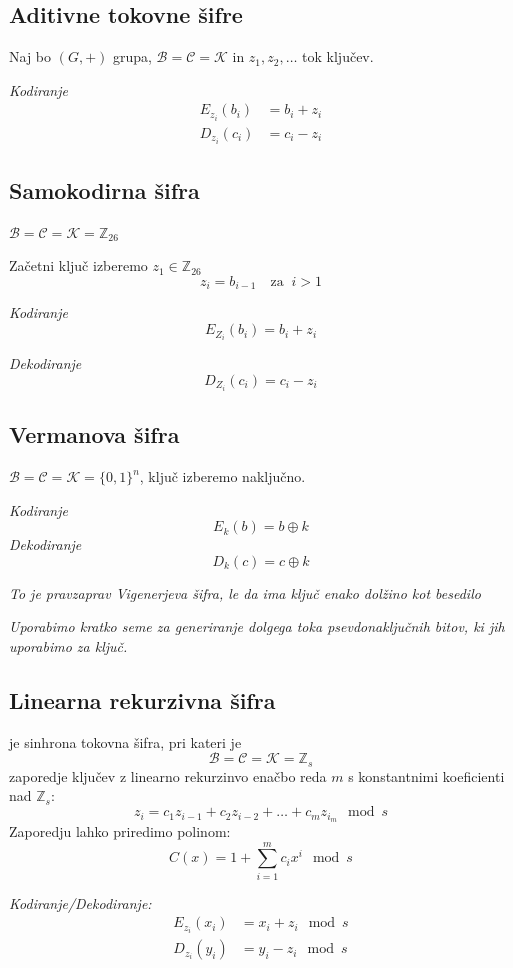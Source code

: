 \begin{multicols}{4}
\subsection*{Aditivne tokovne šifre}
Naj bo $(G, +)$ grupa, $\mathcal{B} = \mathcal{C} = \mathcal{K}$ in $z_1, z_2, \dots$ tok ključev.

\textit{Kodiranje}
\begin{align*}
E_{z_i} (b_i) &= b_i + z_i \\	
D_{z_i} (c_i) &= c_i - z_i
\end{align*}

\subsection*{Samokodirna šifra}
$\mathcal{B} = \mathcal{C} = \mathcal{K} = \mathbb{Z}_{26}$

Začetni ključ izberemo $z_1 \in \mathbb{Z}_{26}$
\[ z_i = b_{i-1} \quad \text{za }\ i > 1 \]

\textit{Kodiranje}
\[ E_{Z_i}(b_i) = b_i + z_i \]

\textit{Dekodiranje}
\[ D_{Z_i}(c_i) = c_i - z_i \]

\subsection*{Vermanova šifra}
$\mathcal{B} = \mathcal{C} = \mathcal{K} = \{0, 1\}^n$, ključ izberemo naključno.

\textit{Kodiranje}
\[ E_k(b) = b \oplus k \]
\textit{Dekodiranje}
\[ D_k(c) = c \oplus k \]

\textit{To je pravzaprav Vigenerjeva šifra, le da ima ključ enako dolžino kot besedilo}

\textit{Uporabimo kratko seme za generiranje dolgega toka psevdonaključnih bitov, ki jih uporabimo za ključ.}

\subsection*{Linearna rekurzivna šifra}
je sinhrona tokovna šifra, pri kateri je
\[ \mathcal{B} = \mathcal{C} = \mathcal{K} = \mathbb{Z}_s\]
zaporedje ključev z linearno rekurzinvo enačbo reda $m$ s konstantnimi koeficienti nad $\mathbb{Z}_s$:
\[ z_i = c_1 z_{i-1} + c_2 z_{i-2} + \dots + c_m z_{i_m} \mod s \]
Zaporedju lahko priredimo polinom:
\[ C(x) = 1 + \sum_{i=1}^m c_i x^i \mod s\]

\textit{Kodiranje/Dekodiranje:}
\begin{align*}
	E_{z_i}(x_i) &= x_i + z_i \mod s \\
	D_{z_i}(y_i) &= y_i - z_i \mod s
\end{align*}


\end{multicols}
